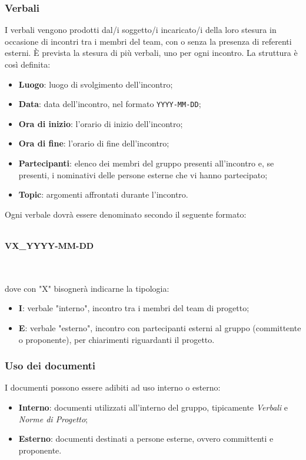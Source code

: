 \subsubsection{Verbali}
I verbali vengono prodotti dal/i soggetto/i incaricato/i della loro stesura in occasione di incontri tra i membri del team, con o senza la presenza di referenti esterni. È prevista la stesura di più verbali, uno per ogni incontro.
La struttura è così definita: \begin{itemize}
\item \textbf{Luogo}: luogo di svolgimento dell'incontro;
\item \textbf{Data}: data dell'incontro, nel formato \texttt{YYYY-MM-DD};
\item \textbf{Ora di inizio}: l'orario di inizio dell'incontro;
\item \textbf{Ora di fine}: l'orario di fine dell'incontro;
\item \textbf{Partecipanti}: elenco dei membri del gruppo presenti all'incontro e, se presenti, i nominativi delle persone esterne che vi hanno partecipato;
\item \textbf{Topic}: argomenti affrontati durante l'incontro.
\end{itemize}
Ogni verbale dovrà essere denominato secondo il seguente formato: \\ \\
\centerline{\textbf{VX\_YYYY-MM-DD}} \\ \\
dove con "X" bisognerà indicarne la tipologia: \begin{itemize}
\item \textbf{I}: verbale "interno", incontro tra i membri del team di progetto;
\item \textbf{E}: verbale "esterno", incontro con partecipanti esterni al gruppo (committente o proponente), per chiarimenti riguardanti il progetto.
\end{itemize}

\subsubsection{Uso dei documenti}
I documenti possono essere adibiti ad uso interno o esterno:
\begin{itemize}
\item \textbf{Interno}: documenti utilizzati all'interno del gruppo, tipicamente \textit{Verbali} e \textit{Norme di Progetto};
\item \textbf{Esterno}: documenti destinati a persone esterne, ovvero committenti e proponente.
\end{itemize}

